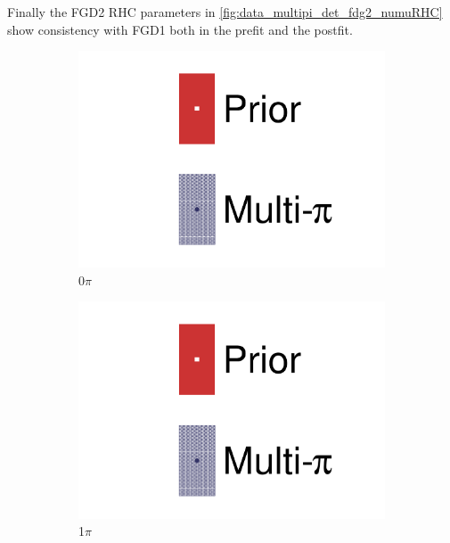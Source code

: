 Finally the FGD2 \numu RHC parameters in \autoref{fig:data_multipi_det_fdg2_numuRHC} show consistency with FGD1 both in the prefit and the postfit.
\begin{figure}[h]
	\centering
	\begin{subfigure}[t]{0.32\textwidth}
		\includegraphics[width=\textwidth,page=55, trim={0mm 0mm 0mm 0mm}, clip]{figures/mach3/2018/data/2018a_FixedCov_RedCov_Mpi_Data_merge_drawPar_withDet}
		\caption{0$\pi$}
	\end{subfigure}
	\begin{subfigure}[t]{0.32\textwidth}
		\includegraphics[width=\textwidth,page=56, trim={0mm 0mm 0mm 0mm}, clip]{figures/mach3/2018/data/2018a_FixedCov_RedCov_Mpi_Data_merge_drawPar_withDet}
		\caption{1$\pi$}
	\end{subfigure}
	\begin{subfigure}[t]{0.32\textwidth}

\end{subfigure}
\end{figure}
